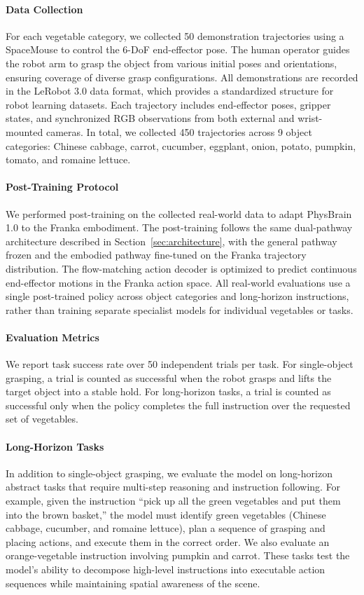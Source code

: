 \paragraph{Data Collection}
For each vegetable category, we collected 50 demonstration trajectories using a SpaceMouse to control the 6-DoF end-effector pose. The human operator guides the robot arm to grasp the object from various initial poses and orientations, ensuring coverage of diverse grasp configurations. All demonstrations are recorded in the LeRobot 3.0 data format, which provides a standardized structure for robot learning datasets. Each trajectory includes end-effector poses, gripper states, and synchronized RGB observations from both external and wrist-mounted cameras. In total, we collected 450 trajectories across 9 object categories: Chinese cabbage, carrot, cucumber, eggplant, onion, potato, pumpkin, tomato, and romaine lettuce.

\paragraph{Post-Training Protocol}
We performed post-training on the collected real-world data to adapt PhysBrain 1.0 to the Franka embodiment. The post-training follows the same dual-pathway architecture described in Section~\ref{sec:architecture}, with the general pathway frozen and the embodied pathway fine-tuned on the Franka trajectory distribution. The flow-matching action decoder is optimized to predict continuous end-effector motions in the Franka action space. All real-world evaluations use a single post-trained policy across object categories and long-horizon instructions, rather than training separate specialist models for individual vegetables or tasks.

\paragraph{Evaluation Metrics}
We report task success rate over 50 independent trials per task. For single-object grasping, a trial is counted as successful when the robot grasps and lifts the target object into a stable hold. For long-horizon tasks, a trial is counted as successful only when the policy completes the full instruction over the requested set of vegetables.

\paragraph{Long-Horizon Tasks}
In addition to single-object grasping, we evaluate the model on long-horizon abstract tasks that require multi-step reasoning and instruction following. For example, given the instruction ``pick up all the green vegetables and put them into the brown basket,'' the model must identify green vegetables (Chinese cabbage, cucumber, and romaine lettuce), plan a sequence of grasping and placing actions, and execute them in the correct order. We also evaluate an orange-vegetable instruction involving pumpkin and carrot. These tasks test the model's ability to decompose high-level instructions into executable action sequences while maintaining spatial awareness of the scene.

